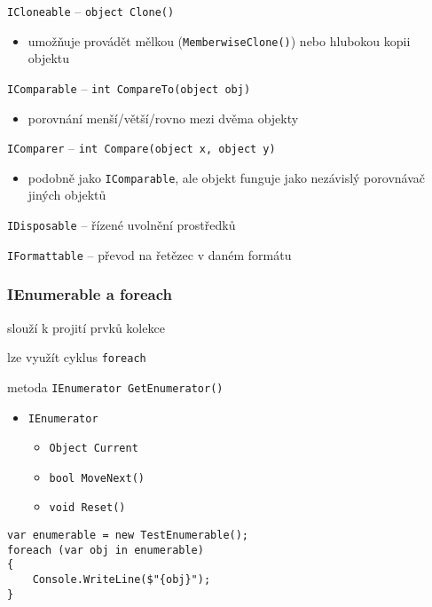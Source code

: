 

\begin{frame}[fragile]
\vfill
\begin{bitemize}{}
\item \lstinline|ICloneable| -- \lstinline|object Clone()|
\begin{itemize}
\item umožňuje provádět mělkou (\lstinline|MemberwiseClone()|) nebo hlubokou kopii objektu
\end{itemize}

\item \lstinline|IComparable| -- \lstinline|int CompareTo(object obj)|
\begin{itemize}
\item porovnání menší/větší/rovno mezi dvěma objekty
\end{itemize}

\item \lstinline|IComparer| -- \lstinline|int Compare(object x, object y)|
\begin{itemize}
\item podobně jako \lstinline|IComparable|, ale objekt funguje jako nezávislý porovnávač jiných objektů
\end{itemize}

\item \lstinline|IDisposable| -- řízené uvolnění prostředků
\item \lstinline|IFormattable| -- převod na řetězec v daném formátu
\end{bitemize}
\vfill
\end{frame}




\begin{frame}[fragile]
\frametitle{IEnumerable a foreach}
\vfill
\begin{bitemize}{}
\item slouží k projití prvků kolekce
\item lze využít cyklus \lstinline|foreach|
\item metoda \lstinline|IEnumerator GetEnumerator()|
\begin{itemize}
\item \lstinline|IEnumerator|
\begin{itemize}
\item \lstinline|Object Current|
\item \lstinline|bool MoveNext()|
\item \lstinline|void Reset()|
\end{itemize}
\end{itemize}
\end{bitemize}
\vfill
\begin{yesblock}
\begin{lstlisting}
var enumerable = new TestEnumerable();
foreach (var obj in enumerable)
{
    Console.WriteLine($"{obj}");
}
\end{lstlisting}
\end{yesblock}
\vfill
\end{frame}





